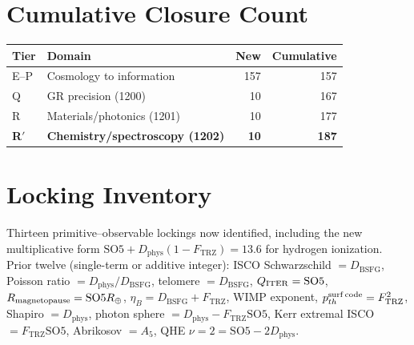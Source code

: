 \documentclass[11pt]{article}
\newcommand{\Ftrz}{F_{\mathrm{TRZ}}}
\newcommand{\Dphys}{D_{\mathrm{phys}}}
\newcommand{\Dbsfg}{D_{\mathrm{BSFG}}}
\newcommand{\SOfive}{\mathrm{SO5}}
\newcommand{\Afive}{A_{5}}
\begin{document}
\section{Cumulative Closure Count}

\begin{tabular}{@{}llrr@{}}
\toprule
Tier & Domain & New & Cumulative \\
\midrule
E--P & Cosmology to information & 157 & 157 \\
Q & GR precision (1200) & 10 & 167 \\
R & Materials/photonics (1201) & 10 & 177 \\
\textbf{R$'$} & \textbf{Chemistry/spectroscopy (1202)} & \textbf{10} & \textbf{187} \\
\bottomrule
\end{tabular}

\section{Locking Inventory}
Thirteen primitive--observable lockings now identified, including the new
multiplicative form $\SOfive + \Dphys(1-\Ftrz) = 13.6$ for hydrogen ionization.
Prior twelve (single-term or additive integer): ISCO Schwarzschild $=\Dbsfg$,
Poisson ratio $=\Dphys/\Dbsfg$, telomere $=\Dbsfg$, $Q_{\rm ITER}=\SOfive$,
$R_{\rm magnetopause}=\SOfive R_\oplus$, $\eta_B=\Dbsfg+\Ftrz$, WIMP exponent,
$p_{th}^{\rm surf\,code}=\Ftrz^2$, Shapiro $=\Dphys$, photon sphere
$=\Dphys-\Ftrz\SOfive$, Kerr extremal ISCO $=\Ftrz\SOfive$, Abrikosov $=\Afive$,
QHE $\nu=2=\SOfive-2\Dphys$.
\end{document}
